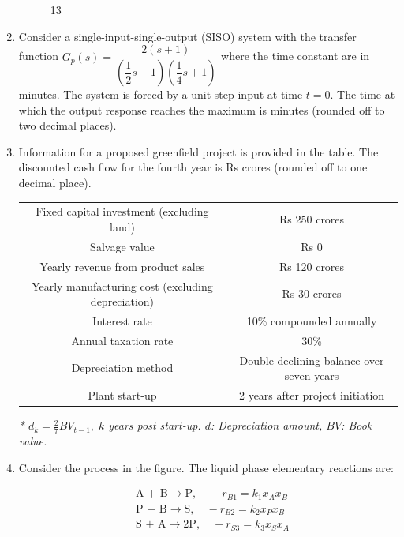 \documentclass[journal]{IEEEtran}
\numberwithin{equation}{enumi}
\numberwithin{figure}{enumi}
\begin{document}
\begin{enumerate}[start=1, label={Q\arabic*.}]
\begin{figure}[H]
    \caption{13}
    \label{fig:13}
\end{figure}
\newpage
\item Consider a single-input-single-output (SISO) system with the transfer function $G_p(s) = \dfrac{2(s+1)}{(\dfrac{1}{2}s+1)(\dfrac{1}{4}s+1)}$ where the time constant are in minutes. The system is forced by a unit step input at time $t = 0$. The time at which the output response reaches the maximum is \underline{\hspace{1.5cm}} minutes (rounded off to two decimal places).
\vspace{0.2cm}
\item Information for a proposed greenfield project is provided in the table. The discounted cash flow for the fourth year is Rs \underline{\hspace{1.5cm}} crores (rounded off to one decimal place).
\begin{table}[H]
\centering
\begin{tabular}{cc}

Fixed capital investment (excluding land) & Rs 250 crores \\ 
Salvage value & Rs 0 \\ 
Yearly revenue from product sales & Rs 120 crores \\ 
Yearly manufacturing cost (excluding depreciation) & Rs 30 crores \\ 
Interest rate & 10\% compounded annually \\ 
Annual taxation rate & 30\% \\ 
Depreciation method & Double declining balance over seven years \\ 
Plant start-up & 2 years after project initiation \\ 

\end{tabular}
\end{table}

\textit{* $d_k = \frac{2}{7} BV_{t-1}, \; k$ years post start-up. $d$: Depreciation amount, $BV$: Book value.}
\item Consider the process in the figure. The liquid phase elementary reactions are:

\[
\begin{aligned}
&\text{A + B} \rightarrow \text{P}, \quad -r_{B1} = k_1 x_A x_B \\
&\text{P + B} \rightarrow \text{S}, \quad -r_{B2} = k_2 x_P x_B \\
&\text{S + A} \rightarrow 2\text{P}, \quad -r_{S3} = k_3 x_S x_A
\end{aligned}
\]


\end{enumerate}
\end{document}
